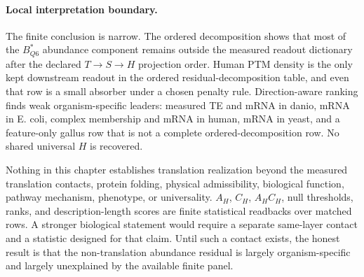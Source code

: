 \paragraph{Local interpretation boundary.}
The finite conclusion is narrow.  The ordered decomposition shows that most of the $B^*_{Q6}$ abundance component remains outside the measured readout dictionary after the declared $T\to S\to H$ projection order.  Human PTM density is the only kept downstream readout in the ordered residual-decomposition table, and even that row is a small absorber under a chosen penalty rule.  Direction-aware ranking finds weak organism-specific leaders: measured TE and mRNA in danio, mRNA in E. coli, complex membership and mRNA in human, mRNA in yeast, and a feature-only gallus row that is not a complete ordered-decomposition row.  No shared universal $H$ is recovered.

Nothing in this chapter establishes translation realization beyond the measured translation contacts, protein folding, physical admissibility, biological function, pathway mechanism, phenotype, or universality.  $A_H$, $C_H$, $A_HC_H$, null thresholds, ranks, and description-length scores are finite statistical readbacks over matched rows.  A stronger biological statement would require a separate same-layer contact and a statistic designed for that claim.  Until such a contact exists, the honest result is that the non-translation abundance residual is largely organism-specific and largely unexplained by the available finite panel.